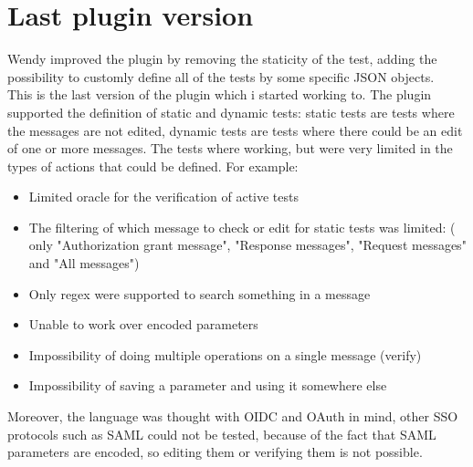 \section{Last plugin version}
Wendy improved the plugin by removing the staticity of the test, adding the possibility to customly define all of the tests by some specific JSON objects. \\
This is the last version of the plugin which i started working to. The plugin supported the definition of static and dynamic tests: static tests are tests where the messages are not edited, dynamic tests are tests where there could be an edit of one or more messages. The tests where working, but were very limited in the types of actions that could be defined. For example:
\begin{itemize}
    \item Limited oracle for the verification of active tests
    \item The filtering of which message to check or edit for static tests was limited: ( only "Authorization grant message", "Response messages", "Request messages" and "All messages")
    \item Only regex were supported to search something in a message
    \item Unable to work over encoded parameters
    \item Impossibility of doing multiple operations on a single message (verify)
    \item Impossibility of saving a parameter and using it somewhere else
\end{itemize}
Moreover, the language was thought with OIDC and OAuth in mind, other SSO protocols such as SAML could not be tested, because of the fact that SAML parameters are encoded, so editing them or verifying them is not possible.
 